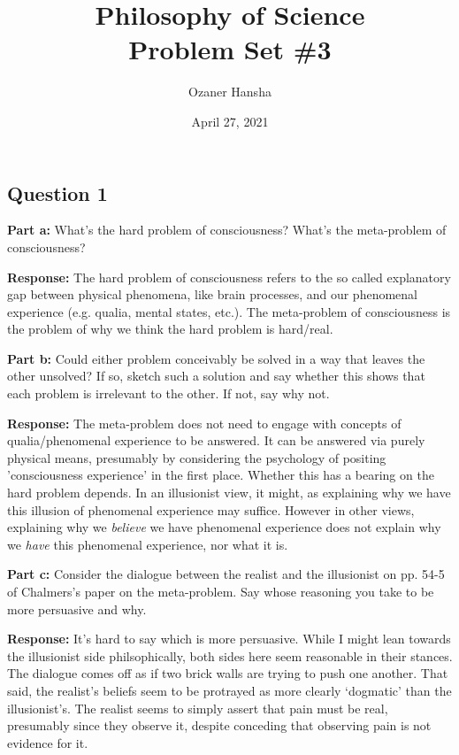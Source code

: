 \documentclass{article}
\begin{document}
\title{Philosophy of Science\\ Problem Set \#3}
\author{Ozaner Hansha}
\date{April 27, 2021}
\maketitle

\subsection*{Question 1}
\noindent\textbf{Part a:} What's the hard problem of consciousness? What's the meta-problem of consciousness?
\bigskip

\noindent\textbf{Response:} The hard problem of consciousness refers to the so called explanatory gap between physical phenomena, like brain processes, and our phenomenal experience (e.g. qualia, mental states, etc.). The meta-problem of consciousness is the problem of why we think the hard problem is hard/real.
\bigskip

\noindent\textbf{Part b:} Could either problem conceivably be solved in a way that leaves the other unsolved? If so, sketch such a solution and say whether this shows that each problem is irrelevant to the other. If not, say why not.
\bigskip

\noindent\textbf{Response:} The meta-problem does not need to engage with concepts of qualia/phenomenal experience to be answered. It can be answered via purely physical means, presumably by considering the psychology of positing 'consciousness experience' in the first place. Whether this has a bearing on the hard problem depends. In an illusionist view, it might, as explaining why we have this illusion of phenomenal experience may suffice. However in other views, explaining why we \textit{believe} we have phenomenal experience does not explain why we \textit{have} this phenomenal experience, nor what it is.
\bigskip

\noindent\textbf{Part c:} Consider the dialogue between the realist and the illusionist on pp. 54-5 of Chalmers’s paper on the meta-problem. Say whose reasoning you take to be more persuasive and why.
\bigskip

\noindent\textbf{Response:} It's hard to say which is more persuasive. While I might lean towards the illusionist side philsophically, both sides here seem reasonable in their stances. The dialogue comes off as if two brick walls are trying to push one another. That said, the realist's beliefs seem to be protrayed as more clearly `dogmatic' than the illusionist's. The realist seems to simply assert that pain must be real, presumably since they observe it, despite conceding that observing pain is not evidence for it.
\bigskip
\end{document}
